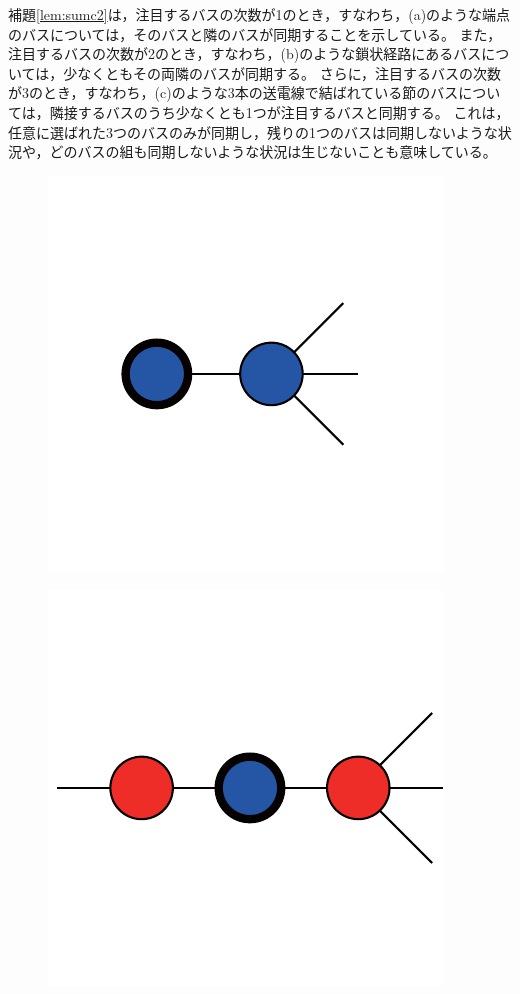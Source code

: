 \documentclass[tombow,dvipdfmx]{corona-a5-1.1}
\begin{document}
補題\ref{lem:sumc2}は，注目するバスの次数が1のとき，すなわち，(a)のような端点のバスについては，そのバスと隣のバスが同期することを示している。
また，注目するバスの次数が2のとき，すなわち，(b)のような鎖状経路にあるバスについては，少なくともその両隣のバスが同期する。
さらに，注目するバスの次数が3のとき，すなわち，(c)のような3本の送電線で結ばれている節のバスについては，隣接するバスのうち少なくとも1つが注目するバスと同期する。
これは，任意に選ばれた3つのバスのみが同期し，残りの1つのバスは同期しないような状況や，どのバスの組も同期しないような状況は生じないことも意味している。

\begin{figure}[t]
  \centering
  {
  \begin{minipage}{0.3\linewidth}
    \centering
    \includegraphics[width = .60\linewidth]{figs/1degbus}
    \label{fig:N1} 
  \end{minipage}
  \begin{minipage}{0.3\linewidth}
    \centering
    \includegraphics[width = .60\linewidth]{figs/2degbus}

\end{minipage}}
\end{figure}
\end{document}
